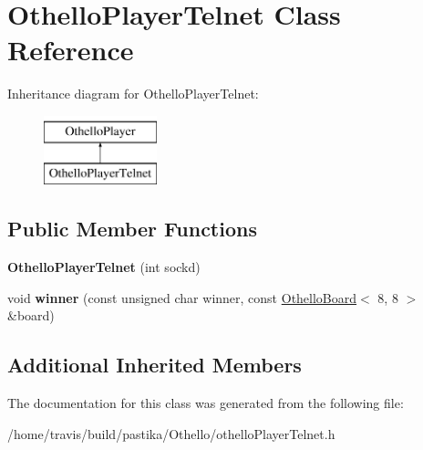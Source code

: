 \hypertarget{classOthelloPlayerTelnet}{\section{Othello\-Player\-Telnet Class Reference}
\label{classOthelloPlayerTelnet}
}
Inheritance diagram for Othello\-Player\-Telnet\-:\begin{figure}[H]
\begin{center}
\leavevmode
\includegraphics[height=2.000000cm]{classOthelloPlayerTelnet}
\end{center}
\end{figure}
\subsection*{Public Member Functions}
\begin{DoxyCompactItemize}
\item 
\hypertarget{classOthelloPlayerTelnet_a6d5600e72342f5bf6ce0c5e9300403a0}{{\bfseries Othello\-Player\-Telnet} (int sockd)}\label{classOthelloPlayerTelnet_a6d5600e72342f5bf6ce0c5e9300403a0}

\item 
\hypertarget{classOthelloPlayerTelnet_a2903532fbbc2de163b4bf3c14e214dfe}{void {\bfseries winner} (const unsigned char winner, const \hyperlink{classOthelloBoard}{Othello\-Board}$<$ 8, 8 $>$ \&board)}\label{classOthelloPlayerTelnet_a2903532fbbc2de163b4bf3c14e214dfe}

\end{DoxyCompactItemize}
\subsection*{Additional Inherited Members}


The documentation for this class was generated from the following file\-:\begin{DoxyCompactItemize}
\item 
/home/travis/build/pastika/\-Othello/othello\-Player\-Telnet.\-h\end{DoxyCompactItemize}
